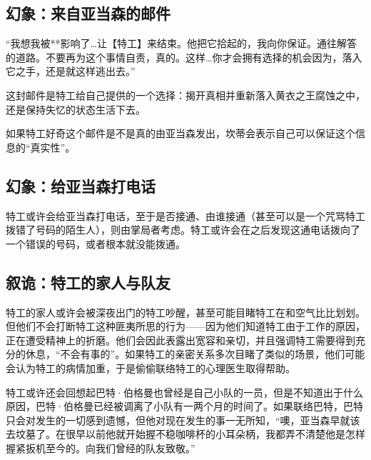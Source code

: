 \subsection{幻象：来自亚当森的邮件}

“我想我被**影响了…让【特工】来结束。他把它拾起的，我向你保证。通往解答的道路。不要再为这个事情自责，真的。这样…你才会拥有选择的机会因为，落入它之手，还是就这样逃出去。”

这封邮件是特工给自己提供的一个选择：揭开真相并重新落入黄衣之王腐蚀之中，还是保持失忆的状态生活下去。

如果特工好奇这个邮件是不是真的由亚当森发出，坎蒂会表示自己可以保证这个信息的“真实性”。

\subsection{幻象：给亚当森打电话}
特工或许会给亚当森打电话，至于是否接通、由谁接通（甚至可以是一个咒骂特工拨错了号码的陌生人），则由掌局者考虑。特工或许会在之后发现这通电话拨向了一个错误的号码，或者根本就没能拨通。

\subsection{叙诡：特工的家人与队友}
特工的家人或许会被深夜出门的特工吵醒，甚至可能目睹特工在和空气比比划划。但他们不会打断特工这种匪夷所思的行为——因为他们知道特工由于工作的原因，正在遭受精神上的折磨。他们会因此表露出宽容和亲切，并且强调特工需要得到充分的休息，“不会有事的”。如果特工的亲密关系多次目睹了类似的场景，他们可能会认为特工的病情加重，于是偷偷联络特工的心理医生取得帮助。

特工或许还会回想起巴特·伯格曼也曾经是自己小队的一员，但是不知道出于什么原因，巴特·伯格曼已经被调离了小队有一两个月的时间了。如果联络巴特，巴特只会对发生的一切感到遗憾，但他对现在发生的事一无所知，“噢，亚当森早就该去坟墓了。在很早以前他就开始握不稳咖啡杯的小耳朵柄，我都弄不清楚他是怎样握紧扳机至今的。向我们曾经的队友致敬。”